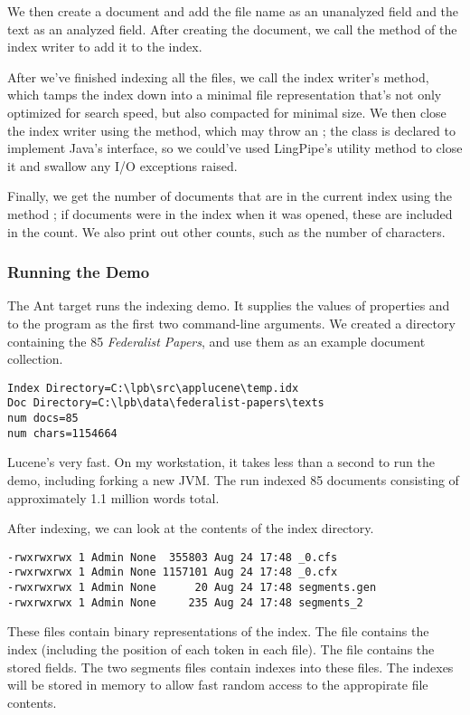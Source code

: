 We then create a document and add the file name as an unanalyzed field
and the text as an analyzed field.  After creating the document, we
call the  method of the index writer to
add it to the index.

After we've finished indexing all the files, we call the index
writer's  method, which tamps the index down into a
minimal file representation that's not only optimized for search
speed, but also compacted for minimal size.  We then close the index
writer using the  method, which may throw an
; the  class is declared to
implement Java's  interface, so we could've used
LingPipe's  utility method to close it
and swallow any I/O exceptions raised.

Finally, we get the number of documents that are in the current index
using the method ; if documents were in the index when
it was opened, these are included in the count.  We also print out 
other counts, such as the number of characters.

\subsubsection{Running the Demo}

The Ant target  runs the indexing demo.  It
supplies the values of properties  and 
to the program as the first two command-line arguments.  We created a
directory containing the 85 {\it Federalist Papers}, and use them
as an example document collection.
%
\begin{verbatim}
Index Directory=C:\lpb\src\applucene\temp.idx
Doc Directory=C:\lpb\data\federalist-papers\texts
num docs=85
num chars=1154664
\end{verbatim}
%
Lucene's very fast.  On my workstation, it takes less than a second to
run the demo, including forking a new JVM.  The run indexed 85
documents consisting of approximately 1.1 million words total.

After indexing, we can look at the contents of the index directory.
%
\begin{verbatim}
-rwxrwxrwx 1 Admin None  355803 Aug 24 17:48 _0.cfs
-rwxrwxrwx 1 Admin None 1157101 Aug 24 17:48 _0.cfx
-rwxrwxrwx 1 Admin None      20 Aug 24 17:48 segments.gen
-rwxrwxrwx 1 Admin None     235 Aug 24 17:48 segments_2
\end{verbatim}
%
These files contain binary representations of the index.  The
 file contains the index (including the position of each
token in each file).  The  file contains the stored fields. 
The two segments files contain indexes into these files.  The indexes
will be stored in memory to allow fast random access to the appropirate
file contents.

